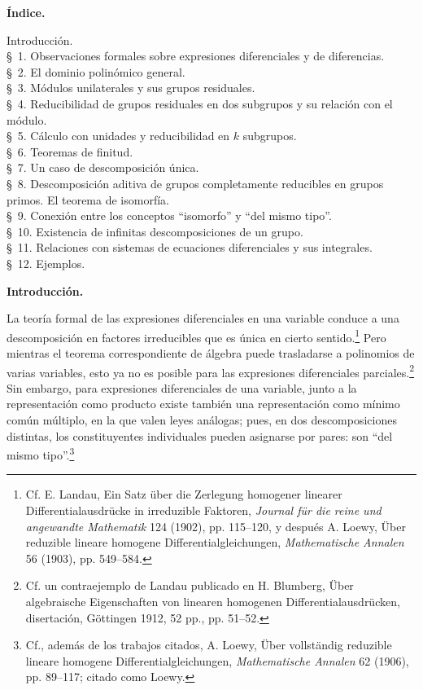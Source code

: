 \documentclass[11pt]{article}
\begin{document}
\begin{center}
\textbf{Índice.}
\end{center}
\begin{center}
\begin{minipage}{0.82\linewidth}
Introducción.\\
\S~1. Observaciones formales sobre expresiones diferenciales y de diferencias.\\
\S~2. El dominio polinómico general.\\
\S~3. Módulos unilaterales y sus grupos residuales.\\
\S~4. Reducibilidad de grupos residuales en dos subgrupos y su relación con el módulo.\\
\S~5. Cálculo con unidades y reducibilidad en $k$ subgrupos.\\
\S~6. Teoremas de finitud.\\
\S~7. Un caso de descomposición única.\\
\S~8. Descomposición aditiva de grupos completamente reducibles en grupos primos. El teorema de isomorfía.\\
\S~9. Conexión entre los conceptos ``isomorfo'' y ``del mismo tipo''.\\
\S~10. Existencia de infinitas descomposiciones de un grupo.\\
\S~11. Relaciones con sistemas de ecuaciones diferenciales y sus integrales.\\
\S~12. Ejemplos.
\end{minipage}
\end{center}

\begin{center}\textbf{Introducción.}\end{center}

La teoría formal de las expresiones diferenciales en una variable conduce a una descomposición en factores irreducibles que es única en cierto sentido.\footnote{Cf. E. Landau, Ein Satz über die Zerlegung homogener linearer Differentialausdrücke in irreduzible Faktoren, \emph{Journal für die reine und angewandte Mathematik} 124 (1902), pp. 115--120, y después A. Loewy, Über reduzible lineare homogene Differentialgleichungen, \emph{Mathematische Annalen} 56 (1903), pp. 549--584.} Pero mientras el teorema correspondiente de álgebra puede trasladarse a polinomios de varias variables, esto ya no es posible para las expresiones diferenciales parciales.\footnote{Cf. un contraejemplo de Landau publicado en H. Blumberg, Über algebraische Eigenschaften von linearen homogenen Differentialausdrücken, disertación, Göttingen 1912, 52 pp., pp. 51--52.} Sin embargo, para expresiones diferenciales de una variable, junto a la representación como producto existe también una representación como mínimo común múltiplo, en la que valen leyes análogas; pues, en dos descomposiciones distintas, los constituyentes individuales pueden asignarse por pares: son ``del mismo tipo''.\footnote{Cf., además de los trabajos citados, A. Loewy, Über vollständig reduzible lineare homogene Differentialgleichungen, \emph{Mathematische Annalen} 62 (1906), pp. 89--117; citado como Loewy.}
\end{document}
